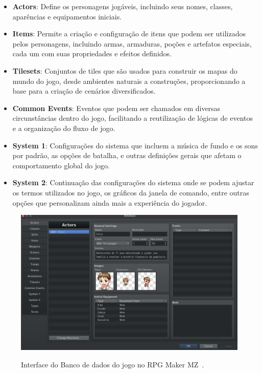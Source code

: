 \begin{itemize}
	\item \textbf{Actors}: Define os personagens jogáveis, incluindo seus nomes, classes, aparências e equipamentos iniciais.
	\item \textbf{Items}: Permite a criação e configuração de itens que podem ser utilizados pelos personagens, incluindo armas, armaduras, poções e artefatos especiais, cada um com suas propriedades e efeitos definidos.
	\item \textbf{Tilesets}: Conjuntos de tiles que são usados para construir os mapas do mundo do jogo, desde ambientes naturais a construções, proporcionando a base para a criação de cenários diversificados.
	\item \textbf{Common Events}: Eventos que podem ser chamados em diversas circunstâncias dentro do jogo, facilitando a reutilização de lógicas de eventos e a organização do fluxo de jogo.
	\item \textbf{System 1}: Configurações do sistema que incluem a música de fundo e os sons por padrão, as opções de batalha, e outras definições gerais que afetam o comportamento global do jogo.
	\item \textbf{System 2}: Continuação das configurações do sistema onde se podem ajustar os termos utilizados no jogo, os gráficos da janela de comando, entre outras opções que personalizam ainda mais a experiência do jogador.
\end{itemize}

\begin{figure}[ht]
	\centering
	\caption{Interface do Banco de dados do jogo no RPG Maker MZ~\cite{RPGMakerMZ}.}
	\includegraphics[scale=0.25]{Textuais/Pictures/DataBase.png}
	\label{fig:rpgmaker-interface-database}
\end{figure}

